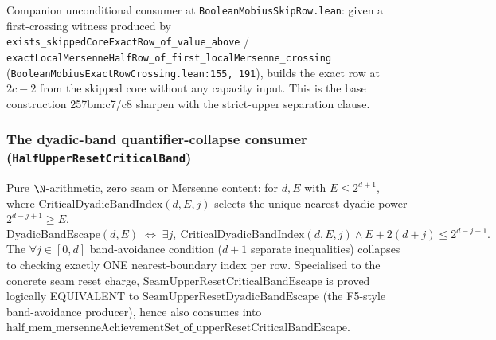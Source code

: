 \begin{thm}
Companion unconditional consumer at \texttt{BooleanMobiusSkipRow.lean}: given a first-crossing
witness produced by \texttt{exists\_skippedCoreExactRow\_of\_value\_above} /
\texttt{exactLocalMersenneHalfRow\_of\_first\_localMersenne\_crossing}
(\texttt{BooleanMobiusExactRowCrossing.lean:155,\,191}), builds the exact row at $2c-2$ from the
skipped core without any capacity input. This is the base construction 257bm:c7/c8 sharpen with
the strict-upper separation clause.
\par\noindent{}   
\end{thm}

\subsubsection*{The dyadic-band quantifier-collapse consumer (\texttt{HalfUpperResetCriticalBand})}

\begin{thm}
Pure $\N$-arithmetic, zero seam or Mersenne content: for $d,E$ with $E\le2^{d+1}$, where $\mathrm{CriticalDyadicBandIndex}(d,E,j)$ selects the unique nearest dyadic power $2^{d-j+1}\ge E$,
\[
\mathrm{DyadicBandEscape}(d,E) \;\Longleftrightarrow\; \exists j,\ \mathrm{CriticalDyadicBandIndex}(d,E,j) \wedge E + 2(d+j) \le 2^{d-j+1}.
\]
The $\forall j\in[0,d]$ band-avoidance condition ($d+1$ separate inequalities) collapses to
checking exactly ONE nearest-boundary index per row. Specialised to the concrete seam reset
charge, $\mathrm{SeamUpperResetCriticalBandEscape}$ is proved logically EQUIVALENT to
$\mathrm{SeamUpperResetDyadicBandEscape}$ (the F5-style band-avoidance producer), hence also
consumes into $\mathrm{half\_mem\_mersenneAchievementSet\_of\_upperResetCriticalBandEscape}$.
\par\noindent{}      
\end{thm}

